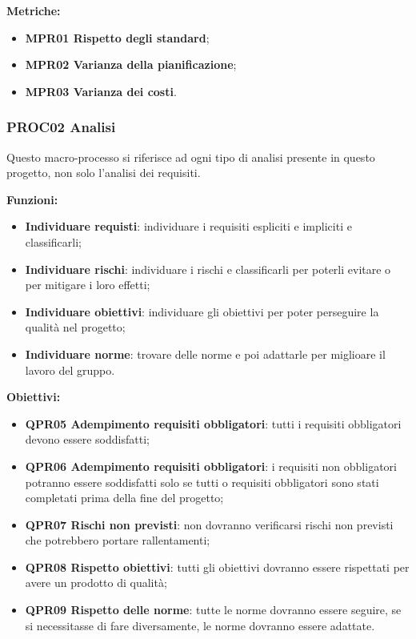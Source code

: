 \documentclass[../piano_di_qualifica.tex]{subfiles}
\begin{document}
\textbf{Metriche:}
\begin{itemize}
	\item \textbf{MPR01 Rispetto degli standard};
	\item \textbf{MPR02 Varianza della pianificazione};
	\item \textbf{MPR03 Varianza dei costi}.
\end{itemize}

\subsubsection{PROC02 Analisi}
Questo macro-processo si riferisce ad ogni tipo di analisi presente in questo progetto, non solo l'analisi dei requisiti.

\textbf{Funzioni:}
\begin{itemize}
	\item \textbf{Individuare requisti}: individuare i requisiti espliciti e impliciti e classificarli;
	\item \textbf{Individuare rischi}: individuare i rischi e classificarli per poterli evitare o per mitigare i loro effetti;
	\item \textbf{Individuare obiettivi}: individuare gli obiettivi per poter perseguire la qualità nel progetto;
	\item \textbf{Individuare norme}: trovare delle norme e poi adattarle per miglioare il lavoro del gruppo.
\end{itemize}

\textbf{Obiettivi:}
\begin{itemize}
	\item \textbf{QPR05 Adempimento requisiti obbligatori}: tutti i requisiti obbligatori devono essere soddisfatti;
	\item \textbf{QPR06 Adempimento requisiti obbligatori}: i requisiti non obbligatori potranno essere soddisfatti solo se tutti o requisiti obbligatori sono stati completati prima della fine del progetto;
	\item \textbf{QPR07 Rischi non previsti}: non dovranno verificarsi rischi non previsti che potrebbero portare rallentamenti;
	\item \textbf{QPR08 Rispetto obiettivi}: tutti gli obiettivi dovranno essere rispettati per avere un prodotto di qualità;
	\item \textbf{QPR09 Rispetto delle norme}: tutte le norme dovranno essere seguire, se si necessitasse di fare diversamente, le norme dovranno essere adattate.
\end{itemize}
\end{document}
